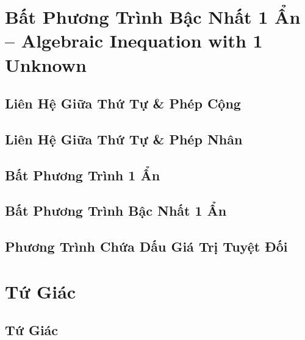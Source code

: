 \documentclass{article}
\numberwithin{equation}{section}
\begin{document}

\section{Bất Phương Trình Bậc Nhất 1 Ẩn -- Algebraic Inequation with 1 Unknown}

\subsection{Liên Hệ Giữa Thứ Tự \& Phép Cộng}


\subsection{Liên Hệ Giữa Thứ Tự \& Phép Nhân}


\subsection{Bất Phương Trình 1 Ẩn}


\subsection{Bất Phương Trình Bậc Nhất 1 Ẩn}


\subsection{Phương Trình Chứa Dấu Giá Trị Tuyệt Đối}


\section{Tứ Giác}

\subsection{Tứ Giác}
\end{document}
